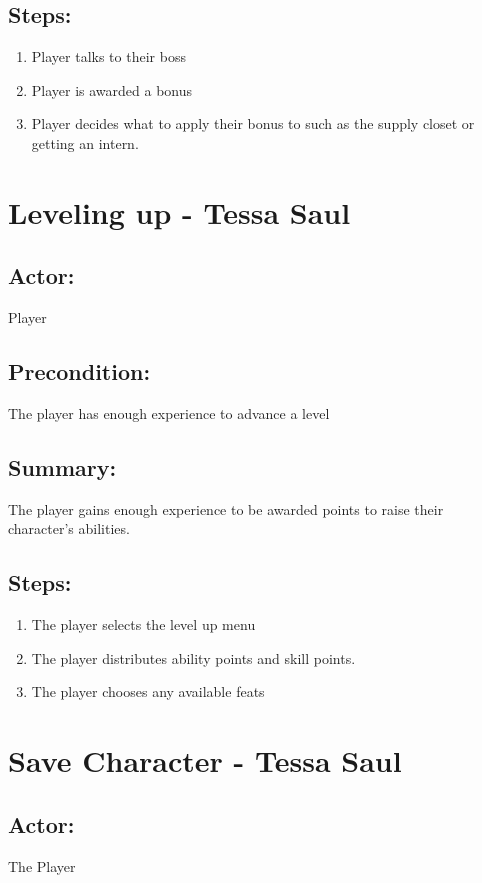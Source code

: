 \documentclass[11pt]{article}
\begin{document}
        \subsection{Steps:}
        \begin{enumerate}
        \item Player talks to their boss
        \item Player is awarded a bonus
        \item Player decides what to apply their bonus to such as the supply closet or getting an intern. 
        \end{enumerate}
    
      \section{Leveling up - Tessa Saul}
      \subsection{Actor:} Player 

      \subsection{Precondition:} The player has enough experience to advance a level

      \subsection{Summary:} The player gains enough experience to be awarded points to raise their character's abilities.

      \subsection{Steps:}
      \begin{enumerate}
      \item The player selects the level up menu
      \item The player distributes ability points and skill points. 
      \item The player chooses any available feats
      \end{enumerate}
    
    \section{Save Character - Tessa Saul}
      \subsection{Actor:} The Player
      
\end{document}
